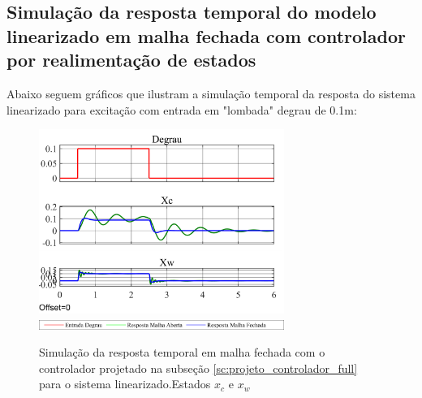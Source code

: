 \documentclass[a4paper]{ifacconf}
\begin{document}
    \subsection{Simulação da resposta temporal do modelo linearizado em malha fechada com controlador por realimentação de estados} \label{sc:analise_resposta}
    
    Abaixo seguem gráficos que ilustram a simulação temporal da resposta do sistema linearizado para excitação com entrada em "lombada" degrau de 0.1m:
    \FloatBarrier
    \begin{figure}[htbp]
        \begin{centering}
            \includegraphics[width=8cm]{img/simulaca_temporal_linear_realimentacao.png}
            \includegraphics[width=8cm]{img/sim_linear_simulink_temp_leg.png}
            \caption{Simulação da resposta temporal em malha fechada com o controlador projetado na subseção \ref{sc:projeto_controlador_full} para o sistema linearizado.Estados $x_c$ e $x_w$ }
            \label{fig:simulaca_temporal_linear_realimentacao}
        \end{centering}
    \end{figure}
    \FloatBarrier
	
\end{document}
